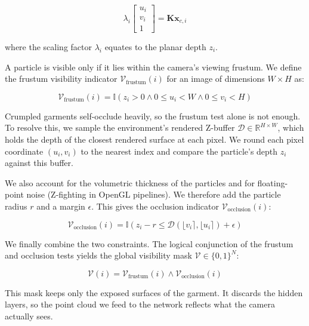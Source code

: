 \documentclass[journal]{IEEEtran}
\begin{document}
\begin{equation}
    \lambda_i \begin{bmatrix} u_i \\ v_i \\ 1 \end{bmatrix} = \mathbf{K} \mathbf{x}_{c,i}
\end{equation}

where the scaling factor $\lambda_i$ equates to the planar depth $z_i$. 

A particle is visible only if it lies within the camera's viewing frustum. We define the frustum visibility indicator $\mathcal{V}_{\text{frustum}}(i)$ for an image of dimensions $W \times H$ as:

\begin{equation}
    \mathcal{V}_{\text{frustum}}(i) = \mathbb{I}(z_i > 0 \land 0 \le u_i < W \land 0 \le v_i < H)
\end{equation}

Crumpled garments self-occlude heavily, so the frustum test alone is not enough. To resolve this, we sample the environment's rendered Z-buffer $\mathcal{D} \in \mathbb{R}^{H \times W}$, which holds the depth of the closest rendered surface at each pixel. We round each pixel coordinate $(u_i, v_i)$ to the nearest index and compare the particle's depth $z_i$ against this buffer.

We also account for the volumetric thickness of the particles and for floating-point noise (Z-fighting in OpenGL pipelines). We therefore add the particle radius $r$ and a margin $\epsilon$. This gives the occlusion indicator $\mathcal{V}_{\text{occlusion}}(i)$:

\begin{equation}
    \mathcal{V}_{\text{occlusion}}(i) = \mathbb{I}(z_i - r \le \mathcal{D}(\lfloor v_i \rceil, \lfloor u_i \rceil) + \epsilon)
\end{equation}

We finally combine the two constraints. The logical conjunction of the frustum and occlusion tests yields the global visibility mask $\mathcal{V} \in \{0, 1\}^N$:

\begin{equation}
    \mathcal{V}(i) = \mathcal{V}_{\text{frustum}}(i) \land \mathcal{V}_{\text{occlusion}}(i)
\end{equation}

This mask keeps only the exposed surfaces of the garment. It discards the hidden layers, so the point cloud we feed to the network reflects what the camera actually sees.
\end{document}
